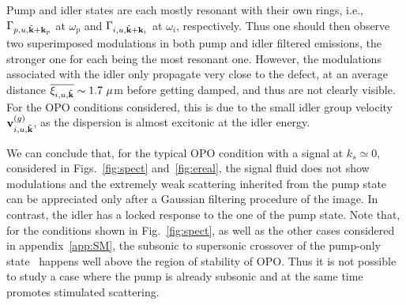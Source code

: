 Pump and idler states are each mostly resonant with their own
rings, i.e., $\Gamma_{p,u, \tilde{\mathbf{k}}+\mathbf{k}_p}$ at $\omega_p$
and $\Gamma_{i,u, \tilde{\mathbf{k}}+\mathbf{k}_i}$ at $\omega_i$,
respectively. Thus one should then observe two superimposed
modulations in both pump and idler filtered emissions, the stronger
one for each being the most resonant one.
%
However, the modulations associated with the idler only propagate very
close to the defect, at an average distance
$\overline{\xi_{i,u,\tilde{\mathbf{k}}}} \sim 1.7~\mu$m before getting
damped, and thus are not clearly visible. For the OPO conditions
considered, this is due to the small idler group velocity
$\mathbf{v}_{i,u,\tilde{\mathbf{k}}}^{(g)}$, as the dispersion is almost
excitonic at the idler energy.

We can conclude that, for the typical OPO condition with a signal at
$k_s \simeq 0$, considered in Figs.~\ref{fig:spect}
and~\ref{fig:ereal}, the signal fluid does not show modulations and
the extremely weak scattering inherited from the pump state can be
appreciated only after a Gaussian filtering procedure of the image. In
contrast, the idler has a locked response to the one of the pump
state.
%
Note that, for the conditions shown in Fig.~\ref{fig:spect}, as well
as the other cases considered in appendix~\ref{app:SM}, the subsonic to
supersonic crossover of the pump-only state~\cite{Amo_2009} happens
well above the region of stability of OPO. Thus it is not possible to
study a case where the pump is already subsonic and at the same time
promotes stimulated scattering.


